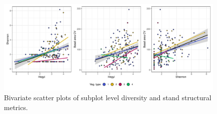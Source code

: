 \begin{refsection}
\begin{supplement}
\begin{figure}[H]
	\includegraphics[width=\linewidth]{img/pred_comp_subplot}
	\caption[Bivariate plots of subplot diversity and stand structural metrics]{Bivariate scatter plots of subplot level diversity and stand structural metrics.}
	\label{tls:pred_comp_subplot}
\end{figure}


\begin{landscape}
	
\end{landscape}

\end{supplement}

\end{refsection}

